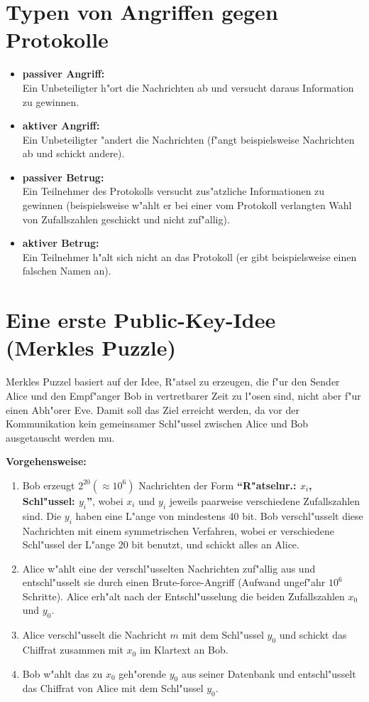 \section{Typen von Angriffen gegen Protokolle}

\begin{itemize}
  \item{\bf passiver Angriff:} \\
    Ein Unbeteiligter h"ort die Nachrichten ab und versucht daraus 
    Information zu gewinnen.
  \item{\bf aktiver Angriff:} \\
    Ein Unbeteiligter "andert die Nachrichten (f"angt beispielsweise 
    Nachrichten ab und schickt andere).
  \item{\bf passiver Betrug:} \\
    Ein Teilnehmer des Protokolls versucht zus"atzliche Informationen 
    zu gewinnen (bei\-spielsweise w"ahlt er bei einer vom Protokoll 
    verlangten Wahl von Zufallszahlen geschickt und nicht zuf"allig).
  \item{\bf aktiver Betrug:} \\
    Ein Teilnehmer h"alt sich nicht an das Protokoll (er gibt 
    beispielsweise einen falschen Namen an).
\end{itemize}

\section{Eine erste Public-Key-Idee (Merkles Puzzle)}

Merkles Puzzel basiert auf der Idee, R"atsel zu erzeugen, die f"ur den Sender 
Alice und
den Empf"anger Bob in vertretbarer Zeit zu l"osen sind, nicht aber
f"ur einen Abh"orer Eve. Damit soll das Ziel erreicht werden, da\3 vor
der Kommunikation kein gemeinsamer Schl"ussel zwischen Alice und Bob
ausgetauscht werden mu\3. 

{\bf Vorgehensweise:} 
\begin{enumerate}
  \item Bob erzeugt $2^{20} (\approx 10^6)$ Nachrichten der Form {\bf
    "`R"atselnr.: $x_i$, Schl"ussel: $y_i$"'}, wobei $x_i$ und
    $y_i$ jeweils paarweise verschiedene Zufallszahlen sind. Die $y_i$
    haben eine L"ange von mindestens 40 bit. Bob verschl"usselt diese 
    Nachrichten mit einem symmetrischen Verfahren, wobei er verschiedene 
    Schl"ussel der L"ange 20 bit benutzt, und schickt alles an Alice.
  \item Alice w"ahlt eine der verschl"usselten Nachrichten zuf"allig
    aus und entschl"usselt sie durch einen Brute-force-Angriff
    (Aufwand ungef"ahr $10^6$ Schritte).  Alice erh"alt nach der
    Entschl"usselung die beiden Zufallszahlen $x_0$ und $y_0$.
  \item Alice verschl"usselt die Nachricht $m$ mit dem Schl"ussel
    $y_0$ und schickt das Chiffrat zusammen mit $x_0$ im Klartext an
    Bob.
  \item Bob w"ahlt das zu $x_0$ geh"orende $y_0$ aus seiner Datenbank
    und entschl"usselt das Chiffrat von Alice mit dem Schl"ussel $y_0$.
\end{enumerate}

